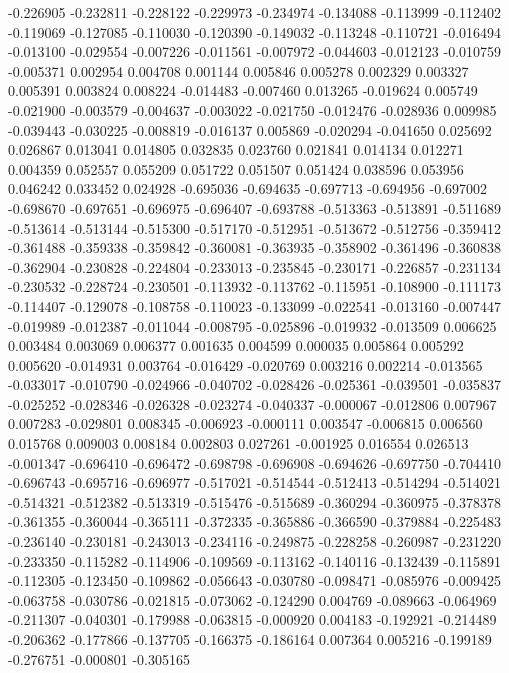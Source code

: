 -0.226905
-0.232811
-0.228122
-0.229973
-0.234974
-0.134088
-0.113999
-0.112402
-0.119069
-0.127085
-0.110030
-0.120390
-0.149032
-0.113248
-0.110721
-0.016494
-0.013100
-0.029554
-0.007226
-0.011561
-0.007972
-0.044603
-0.012123
-0.010759
-0.005371
0.002954
0.004708
0.001144
0.005846
0.005278
0.002329
0.003327
0.005391
0.003824
0.008224
-0.014483
-0.007460
0.013265
-0.019624
0.005749
-0.021900
-0.003579
-0.004637
-0.003022
-0.021750
-0.012476
-0.028936
0.009985
-0.039443
-0.030225
-0.008819
-0.016137
0.005869
-0.020294
-0.041650
0.025692
0.026867
0.013041
0.014805
0.032835
0.023760
0.021841
0.014134
0.012271
0.004359
0.052557
0.055209
0.051722
0.051507
0.051424
0.038596
0.053956
0.046242
0.033452
0.024928
-0.695036
-0.694635
-0.697713
-0.694956
-0.697002
-0.698670
-0.697651
-0.696975
-0.696407
-0.693788
-0.513363
-0.513891
-0.511689
-0.513614
-0.513144
-0.515300
-0.517170
-0.512951
-0.513672
-0.512756
-0.359412
-0.361488
-0.359338
-0.359842
-0.360081
-0.363935
-0.358902
-0.361496
-0.360838
-0.362904
-0.230828
-0.224804
-0.233013
-0.235845
-0.230171
-0.226857
-0.231134
-0.230532
-0.228724
-0.230501
-0.113932
-0.113762
-0.115951
-0.108900
-0.111173
-0.114407
-0.129078
-0.108758
-0.110023
-0.133099
-0.022541
-0.013160
-0.007447
-0.019989
-0.012387
-0.011044
-0.008795
-0.025896
-0.019932
-0.013509
0.006625
0.003484
0.003069
0.006377
0.001635
0.004599
0.000035
0.005864
0.005292
0.005620
-0.014931
0.003764
-0.016429
-0.020769
0.003216
0.002214
-0.013565
-0.033017
-0.010790
-0.024966
-0.040702
-0.028426
-0.025361
-0.039501
-0.035837
-0.025252
-0.028346
-0.026328
-0.023274
-0.040337
-0.000067
-0.012806
0.007967
0.007283
-0.029801
0.008345
-0.006923
-0.000111
0.003547
-0.006815
0.006560
0.015768
0.009003
0.008184
0.002803
0.027261
-0.001925
0.016554
0.026513
-0.001347
-0.696410
-0.696472
-0.698798
-0.696908
-0.694626
-0.697750
-0.704410
-0.696743
-0.695716
-0.696977
-0.517021
-0.514544
-0.512413
-0.514294
-0.514021
-0.514321
-0.512382
-0.513319
-0.515476
-0.515689
-0.360294
-0.360975
-0.378378
-0.361355
-0.360044
-0.365111
-0.372335
-0.365886
-0.366590
-0.379884
-0.225483
-0.236140
-0.230181
-0.243013
-0.234116
-0.249875
-0.228258
-0.260987
-0.231220
-0.233350
-0.115282
-0.114906
-0.109569
-0.113162
-0.140116
-0.132439
-0.115891
-0.112305
-0.123450
-0.109862
-0.056643
-0.030780
-0.098471
-0.085976
-0.009425
-0.063758
-0.030786
-0.021815
-0.073062
-0.124290
0.004769
-0.089663
-0.064969
-0.211307
-0.040301
-0.179988
-0.063815
-0.000920
0.004183
-0.192921
-0.214489
-0.206362
-0.177866
-0.137705
-0.166375
-0.186164
0.007364
0.005216
-0.199189
-0.276751
-0.000801
-0.305165
